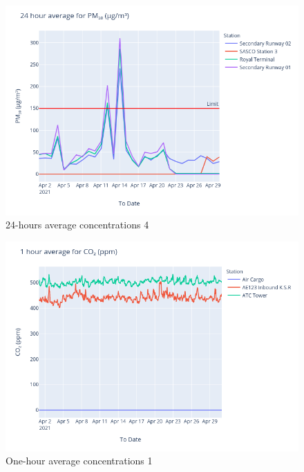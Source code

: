 \documentclass[12pt, oneside]{book}
\begin{document}
{
{\begin{figure}[H]
\centering
\includegraphics[width=\textwidth]{image223}
\caption{24-hours average  concentrations 4}\label{image223}
\end{figure}}{}



{\begin{figure}[H]
\centering
\includegraphics[width=\textwidth]{image188}
\caption{One-hour average  concentrations 1}\label{image188}
\end{figure}}{}

}
\end{document}
